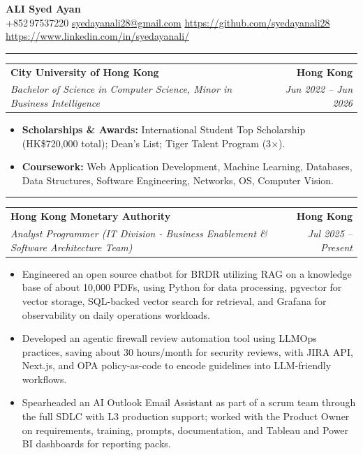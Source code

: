 \documentclass[9pt,a4paper]{article}
\makeatletter
\newcommand{\ressection}[1]{%
  \vspace{0.8em}%
  \noindent{\large\scshape\bfseries #1}\par\nobreak
  \vspace{-\parskip}%
  \noindent\rule{\linewidth}{0.1pt}\par\nobreak
  \vspace{-\parskip}%
}
\newcommand{\resumeSubheading}[4]{%
  \vspace{0.6em}%
  \begin{tabular*}{\textwidth}{l@{\extracolsep{\fill}}r}
    \textbf{#1} & \textbf{#2} \\
    \textit{\small #3} & \textit{\small #4} \\
  \end{tabular*}\vspace{0.32em}}
\makeatother
\begin{document}
\begin{center}
  {\LARGE\bfseries ALI Syed Ayan}\\[0.35em]
  \small
  +852\,97537220 \;\textbar\;
  \href{mailto:syedayanali28@gmail.com}{syedayanali28@gmail.com} \;\textbar\;
  \href{https://github.com/syedayanali28}{https://github.com/syedayanali28} \;\textbar\;
  \href{https://www.linkedin.com/in/syedayanali/}{https://www.linkedin.com/in/syedayanali/}
\end{center}
\vspace{0.55em}
\small

\ressection{Education}
\resumeSubheading{City University of Hong Kong}{Hong Kong}{Bachelor of Science in Computer Science, Minor in Business Intelligence}{Jun 2022 -- Jun 2026}
\begin{itemize}
  \item \textbf{Scholarships \& Awards:} International Student Top Scholarship (HK\$720{,}000 total); Dean's List; Tiger Talent Program (3$\times$).
  \item \textbf{Coursework:} Web Application Development, Machine Learning, Databases, Data Structures, Software Engineering, Networks, OS, Computer Vision.
\end{itemize}

\ressection{Work Experience}

\resumeSubheading{Hong Kong Monetary Authority}{Hong Kong}{Analyst Programmer (IT Division - Business Enablement \& Software Architecture Team)}{Jul 2025 -- Present}
\begin{itemize}
  \item Engineered an open source chatbot for BRDR utilizing RAG on a knowledge base of about 10{,}000 PDFs, using Python for data processing, pgvector for vector storage, SQL-backed vector search for retrieval, and Grafana for observability on daily operations workloads.
  \item Developed an agentic firewall review automation tool using LLMOps practices, saving about 30 hours/month for security reviews, with JIRA API, Next.js, and OPA policy-as-code to encode guidelines into LLM-friendly workflows.
  \item Spearheaded an AI Outlook Email Assistant as part of a scrum team through the full SDLC with L3 production support; worked with the Product Owner on requirements, training, prompts, documentation, and Tableau and Power BI dashboards for reporting packs.
\end{itemize}
\end{document}

